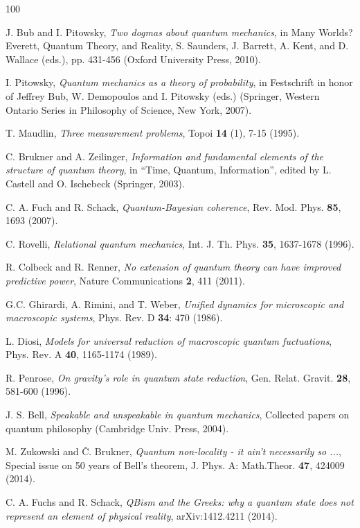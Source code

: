 \documentclass[12pt]{article}
\begin{document}
\begin {thebibliography}{100}

 J. Bub and I. Pitowsky, {\it Two dogmas about quantum mechanics}, in Many Worlds? Everett, Quantum Theory, and Reality, S. Saunders, J. Barrett, A. Kent, and D. Wallace (eds.), pp. 431-456 (Oxford University Press, 2010).

 I. Pitowsky, {\it Quantum mechanics as a theory of probability}, in Festschrift in honor of Jeffrey Bub, W. Demopoulos and I. Pitowsky (eds.) (Springer, Western Ontario Series in Philosophy of Science, New York, 2007). 

 T. Maudlin, {\it Three measurement problems}, Topoi {\bf 14} (1), 7-15 (1995).

 C. Brukner and A. Zeilinger, {\it Information and fundamental elements of the structure of quantum theory}, in ``Time, Quantum, Information'', edited by L. Castell and O. Ischebeck (Springer, 2003).

 C. A. Fuch and R. Schack, {\it Quantum-Bayesian coherence}, Rev. Mod. Phys. {\bf 85}, 1693 (2007).

 C. Rovelli, {\it Relational quantum mechanics}, Int. J. Th. Phys. {\bf  35}, 1637-1678 (1996).

 R. Colbeck and R. Renner, {\it No extension of quantum theory can have improved predictive power}, Nature Communications {\bf 2}, 411 (2011).

 G.C. Ghirardi, A. Rimini, and T. Weber, {\it Unified dynamics for microscopic and macroscopic systems}, Phys. Rev. D {\bf 34}: 470 (1986).

 L. Diosi, {\it Models for universal reduction of macroscopic quantum fuctuations}, Phys. Rev. A {\bf 40}, 1165-1174
(1989).

 R. Penrose, {\it On gravity's role in quantum state reduction}, Gen. Relat. Gravit. {\bf 28}, 581-600 (1996).

 J. S. Bell, {\it Speakable and unspeakable in quantum mechanics}, Collected papers on quantum philosophy (Cambridge Univ. Press, 2004).

 M. Zukowski and  {\v C}. Brukner, {\it Quantum non-locality - it ain't necessarily so ...}, Special issue on 50 years of Bell's theorem, J. Phys. A: Math.Theor. {\bf 47}, 424009 (2014).

 C. A. Fuchs and R. Schack, {\it QBism and the Greeks: why a quantum state does not represent an element of physical reality}, arXiv:1412.4211 (2014). 


\end{thebibliography}
\end{document}
